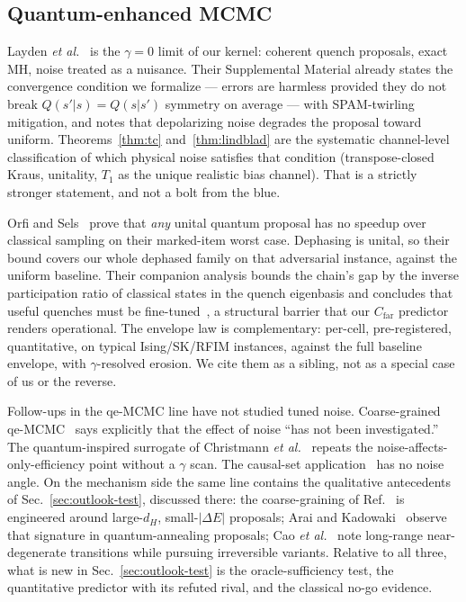 \documentclass[aps,prx,reprint,floatfix,amsmath,amssymb,amsfonts]{revtex4-2}
\begin{document}
\subsection{Quantum-enhanced MCMC}

Layden \emph{et al.}~\cite{Layden2023} is the $\gamma=0$ limit of our
kernel: coherent quench proposals, exact MH, noise treated as a
nuisance. Their Supplemental Material already states the convergence
condition we formalize --- errors are harmless provided they do not
break $Q(s'|s)=Q(s|s')$ symmetry on average --- with SPAM-twirling
mitigation, and notes that depolarizing noise degrades the proposal
toward uniform. Theorems~\ref{thm:tc} and~\ref{thm:lindblad} are the
systematic channel-level classification of which physical noise
satisfies that condition (transpose-closed Kraus, unitality, $T_1$ as
the unique realistic bias channel). That is a strictly stronger
statement, and not a bolt from the blue.

Orfi and Sels~\cite{OrfiSels2024} prove that \emph{any} unital quantum
proposal has no speedup over classical sampling on their marked-item
worst case. Dephasing is unital, so their bound covers our whole
dephased family on that adversarial instance, against the uniform
baseline. Their companion analysis bounds the chain's gap by the
inverse participation ratio of classical states in the quench
eigenbasis and concludes that useful quenches must be
fine-tuned~\cite{OrfiSels2024b}, a structural barrier that our
$C_{\mathrm{far}}$ predictor renders operational. The envelope law is
complementary: per-cell, pre-registered, quantitative, on typical
Ising/SK/RFIM instances, against the full baseline envelope, with
$\gamma$-resolved erosion. We cite them as a sibling, not as a special
case of us or the reverse.

Follow-ups in the qe-MCMC line have not studied tuned noise.
Coarse-grained qe-MCMC~\cite{Ferguson2025} says explicitly that the
effect of noise ``has not been investigated.'' The quantum-inspired
surrogate of Christmann \emph{et al.}~\cite{Christmann2024} repeats the
noise-affects-only-efficiency point without a $\gamma$ scan. The
causal-set application~\cite{Ferguson2025causal} has no noise angle.
On the mechanism side the same line contains the qualitative
antecedents of Sec.~\ref{sec:outlook-test}, discussed there: the
coarse-graining of Ref.~\cite{Ferguson2025} is engineered around
large-$d_H$, small-$|\Delta E|$ proposals; Arai and
Kadowaki~\cite{AraiKadowaki2025} observe that signature in
quantum-annealing proposals; Cao \emph{et al.}~\cite{Cao2026} note
long-range near-degenerate transitions while pursuing irreversible
variants. Relative to all three, what is new in
Sec.~\ref{sec:outlook-test} is the oracle-sufficiency test, the
quantitative predictor with its refuted rival, and the classical
no-go evidence.
\end{document}
